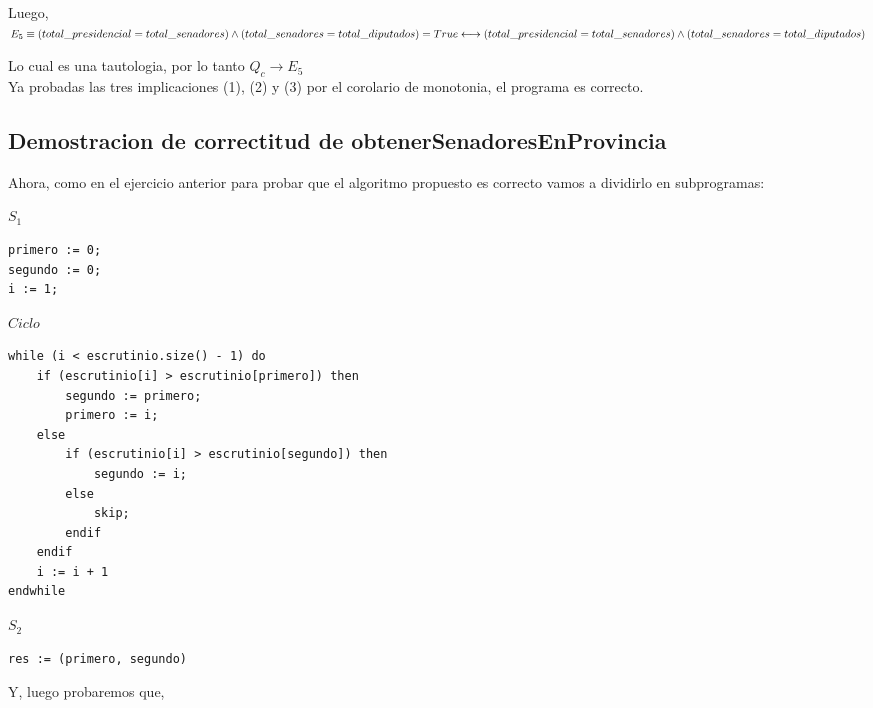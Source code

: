 \documentclass[10pt,a4paper]{article}
\begin{document}
\noindent  Luego, \\

\noindent $E_5 \equiv (total\_presidencial = total\_senadores) \land (total\_senadores = total\_diputados) = True \longleftrightarrow \\
(total\_presidencial = total\_senadores) \land (total\_senadores = total\_diputados) \vspace{0.3cm}$

\noindent Lo cual es una tautologia, por lo tanto $Q_c \rightarrow E_5$ \\

\noindent Ya probadas las tres implicaciones (1), (2) y (3) por el corolario de monotonia, el programa es correcto.

\newpage

\subsection{Demostracion de correctitud de obtenerSenadoresEnProvincia}

Ahora, como en el ejercicio anterior para probar que el algoritmo propuesto es correcto vamos a dividirlo en subprogramas:

\vspace{0.3cm}

$S_1$
	\begin{lstlisting}[caption={},label=code:for]
primero := 0;
segundo := 0;
i := 1;
	\end{lstlisting}

\vspace{0.3cm}

$Ciclo$
	\begin{lstlisting}[caption={},label=code:for]
while (i < escrutinio.size() - 1) do
	if (escrutinio[i] > escrutinio[primero]) then
		segundo := primero;
		primero := i;
	else
		if (escrutinio[i] > escrutinio[segundo]) then
			segundo := i;
		else
			skip;
		endif
	endif
	i := i + 1
endwhile
	\end{lstlisting}

\vspace{0.3cm}

$S_2$

	\begin{lstlisting}[caption={},label=code:for]
res := (primero, segundo)
	\end{lstlisting}

\vspace{0.3cm}

Y, luego probaremos que,
\end{document}
